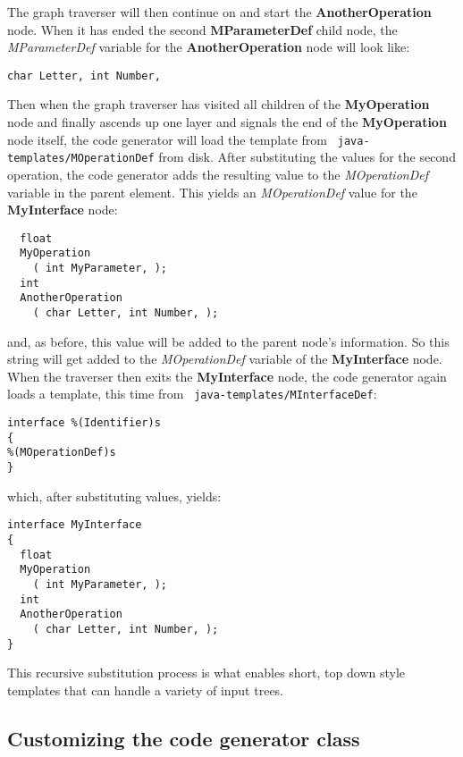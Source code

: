 The graph traverser will then continue on and start the {\bf AnotherOperation}
node. When it has ended the second {\bf MParameterDef} child node, the {\it
MParameterDef\/} variable for the {\bf AnotherOperation} node will look like:
\begin{verbatim}
char Letter, int Number, 
\end{verbatim}
Then when the graph traverser has visited all children of the {\bf MyOperation}
node and finally ascends up one layer and signals the end of the {\bf
MyOperation} node itself, the code generator will load the template from {\tt
java-templates/MOperationDef} from disk. After substituting the values for the
second operation, the code generator adds the resulting value to the {\it
MOperationDef\/} variable in the parent element. This yields an {\it
MOperationDef\/} value for the {\bf MyInterface} node:
\begin{verbatim}
  float
  MyOperation
    ( int MyParameter, );
  int
  AnotherOperation
    ( char Letter, int Number, );
\end{verbatim}
and, as before, this value will be added to the parent node's information. So
this string will get added to the {\it MOperationDef\/} variable of the {\bf
MyInterface} node. When the traverser then exits the {\bf MyInterface} node, the
code generator again loads a template, this time from {\tt
java-templates/MInterfaceDef}:

\begin{verbatim}
interface %(Identifier)s
{
%(MOperationDef)s
}
\end{verbatim}
which, after substituting values, yields:
\begin{verbatim}
interface MyInterface
{
  float
  MyOperation
    ( int MyParameter, );
  int
  AnotherOperation
    ( char Letter, int Number, );
}
\end{verbatim}

This recursive substitution process is what enables short, top down style
templates that can handle a variety of input trees.

\subsection{Customizing the code generator class}
\label{subsection-template-component-generator}


